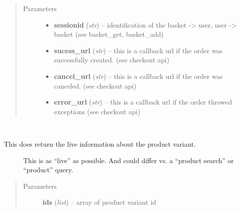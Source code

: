\documentclass[letterpaper,10pt,english]{sphinxmanual}
\begin{document}
\begin{fulllineitems}
\begin{fulllineitems}
\begin{description}
\end{description}
\begin{quote}\begin{description}
\item[{Parameters}] \leavevmode\begin{itemize}
\item {} 
\textbf{sessionid} (\emph{str}) -- identification of the basket -\textgreater{} user,
user -\textgreater{} basket (see basket\_get, basket\_add)

\item {} 
\textbf{sucess\_url} (\emph{str}) -- this is a callback url if the order was
successfully created. (see checkout api)

\item {} 
\textbf{cancel\_url} (\emph{str}) -- this is a callback url if the order was
canceled. (see checkout api)

\item {} 
\textbf{error\_url} (\emph{str}) -- this is a callback url if the order throwed
exceptions (see checkout api)

\end{itemize}

\end{description}\end{quote}

\end{fulllineitems}


\begin{fulllineitems}
\label{collins:collins.Collins.livevariant}~\begin{description}
\item[{This does return the live information about the product variant.}] \leavevmode
This is as ``live'' as possible.
And could differ vs. a ``product search'' or ``product'' query.

\end{description}
\begin{quote}\begin{description}
\item[{Parameters}] \leavevmode
\textbf{ids} (\emph{list}) -- array of product variant id

\end{description}\end{quote}

\end{fulllineitems}


\end{fulllineitems}
\end{document}
